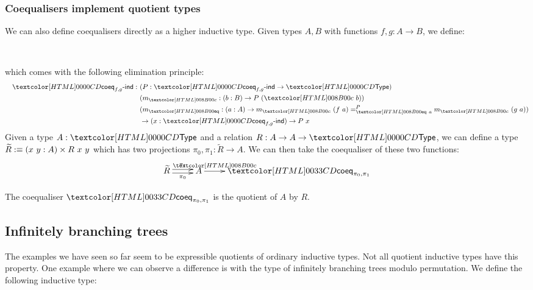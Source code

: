 \subsubsection{Coequalisers implement quotient types}

We can also define coequalisers directly as a higher inductive
type. Given types $A, B$ with functions $f, g : A \to B$, we define:
%
\begin{datatype}{}{\Type}
   \\
\end{datatype}
%
which comes with the following elimination principle:
%
\begin{align*}
  &&\coeqind{f}{g} : &\ (P : \coeqind{f}{g} \to \Type) \\
  &&&\ (m_{\coeqproj} : (b : B) \to P\ (\coeqproj\ b)) \\
  &&&\ (m_{\coeqeq} : (a : A) \to \pathover{P}{\coeqeq\ a}{m_{\coeqproj}\ (f\ a)}{m_{\coeqproj}\ (g\ a)}) \\
  &&&\ \to (x : \coeqind{f}{g}) \to P\ x
\end{align*}
%
Given a type $A : \Type$ and a relation $R : A \to A \to \Type$, we
can define a type $\widetilde{R} \ddefeq (x\ y : A) \times R\ x \ y$ which
has two projections $\pi_0, \pi_1 : \widetilde{R} \to A$. We can then take
the coequaliser of these two functions:
$$
\xymatrix{
\widetilde{R} \ar@<-.5ex>[r]_{\pi_0} \ar@<.5ex>[r]^{\pi_1} &A \ar[r]^-{\coeqproj} &\coeqty{\pi_0}{\pi_1}
}
$$

\begin{proposition}
  The coequaliser $\coeqty{\pi_0}{\pi_1}$ is the quotient of $A$ by
  $R$.
\end{proposition}

\subsection{Infinitely branching trees}
\label{infinitely-branching-trees}

The examples we have seen so far seem to be expressible quotients of
ordinary inductive types. Not all quotient inductive types have this
property. One example where we can observe a difference is with the
type of infinitely branching trees modulo permutation. We define the
following inductive type:
%
\begin{datatype}{\treety}{\Set}
  \constr{\treeleaf}{\treety} \\
  \constr{\treenode}{(\natty \to \treety) \to \treety} \\
\end{datatype}

